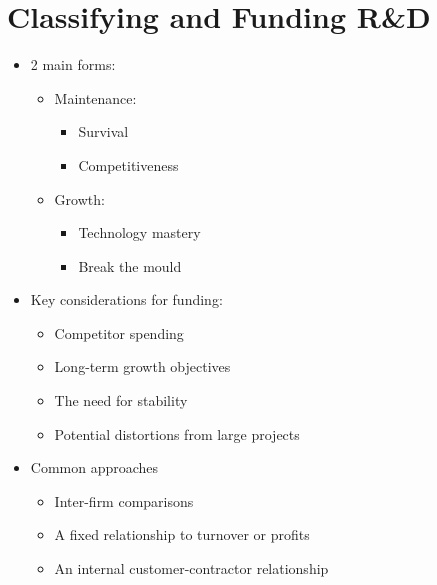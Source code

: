 \documentclass[openany,12pt,a4paper]{book}
\begin{document}
\section{Classifying and Funding R\&D}
\begin{itemize}
    \item 2 main forms:
    \begin{itemize}
        \item Maintenance:
        \begin{itemize}
            \item Survival
            \item Competitiveness
        \end{itemize}
        \item Growth:
        \begin{itemize}
            \item Technology mastery
            \item Break the mould
        \end{itemize}
    \end{itemize}
    \item Key considerations for funding:
    \begin{itemize}
        \item Competitor spending
        \item Long-term growth objectives
        \item The need for stability
        \item Potential distortions from large projects
    \end{itemize}
    \item Common approaches
    \begin{itemize}
        \item Inter-firm comparisons
        \item A fixed relationship to turnover or profits
        \item An internal customer-contractor relationship
    \end{itemize}
\end{itemize}
\end{document}
